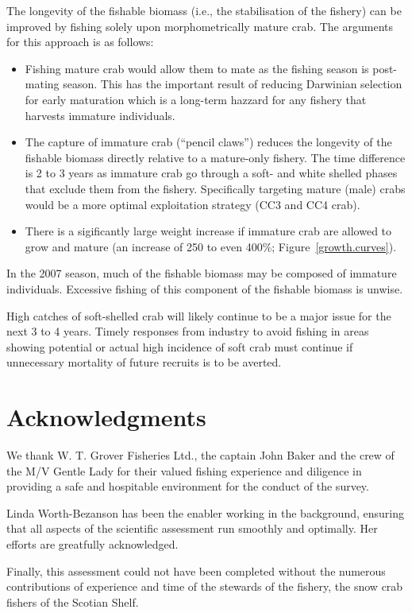 \documentclass[11pt]{article}
\begin{document}
The longevity of the fishable biomass (i.e., the stabilisation of the fishery) can be improved by fishing solely upon morphometrically mature crab. The arguments for this approach is as follows:

\begin{itemize}
  \item Fishing mature crab would allow them to mate as the fishing season is post-mating season. This has the important result of reducing Darwinian selection for early maturation which is a long-term hazzard for any fishery that harvests immature individuals.
  \item The capture of immature crab (``pencil claws'') reduces the longevity of the fishable biomass directly relative to a mature-only fishery. The time difference is 2 to 3 years as immature crab go through a soft- and white shelled phases that exclude them from the fishery. Specifically targeting mature (male) crabs would be a more optimal exploitation strategy (CC3 and CC4 crab).
  \item There is a sigificantly large weight increase if immature crab are allowed to grow and mature (an increase of 250 to even 400\%; Figure~\ref{growth.curves}).
\end{itemize}

In the 2007 season, much of the fishable biomass may be composed of immature individuals. Excessive fishing of this component of the fishable biomass is unwise.

High catches of soft-shelled crab will likely continue to be a major issue for the next 3 to 4 years. Timely responses from industry to avoid fishing in areas showing potential or actual high incidence of soft crab must continue if unnecessary mortality of future recruits is to be averted.


\section{Acknowledgments}

We thank W. T. Grover Fisheries Ltd., the captain John Baker and the crew of the M/V Gentle Lady for their valued fishing experience and diligence in providing a safe and hospitable environment for the conduct of the survey.

Linda Worth-Bezanson has been the enabler working in the background, ensuring that all aspects of the scientific assessment run smoothly and optimally. Her efforts are greatfully acknowledged.

Finally, this assessment could not have been completed without the numerous contributions of experience and time of the stewards of the fishery, the snow crab fishers of the Scotian Shelf.
\end{document}
